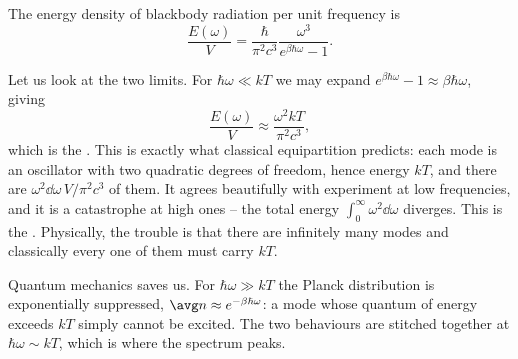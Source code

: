\begin{proposition}
	The energy density of blackbody radiation per unit frequency is
	$$
	\frac{E(\omega)}{V} = \frac{\hbar}{\pi^2 c^3}\frac{\omega^3}{e^{\beta\hbar\omega}-1}.
	$$
\end{proposition}

Let us look at the two limits. For $\hbar\omega \ll kT$ we may expand $e^{\beta\hbar\omega} - 1 \approx \beta\hbar\omega$, giving
$$
\frac{E(\omega)}{V} \approx \frac{\omega^2 kT}{\pi^2 c^3},
$$
which is the . This is exactly what classical equipartition predicts: each mode is an oscillator with two quadratic degrees of freedom, hence energy $kT$, and there are $\omega^2 \dd\omega \,V/\pi^2c^3$ of them. It agrees beautifully with experiment at low frequencies, and it is a catastrophe at high ones -- the total energy $\int_0^\infty \omega^2 \dd\omega$ diverges. This is the . Physically, the trouble is that there are infinitely many modes and classically every one of them must carry $kT$.

Quantum mechanics saves us. For $\hbar\omega \gg kT$ the Planck distribution is exponentially suppressed, $\avg n \approx e^{-\beta\hbar\omega}$: a mode whose quantum of energy exceeds $kT$ simply cannot be excited. The two behaviours are stitched together at $\hbar\omega \sim kT$, which is where the spectrum peaks.

